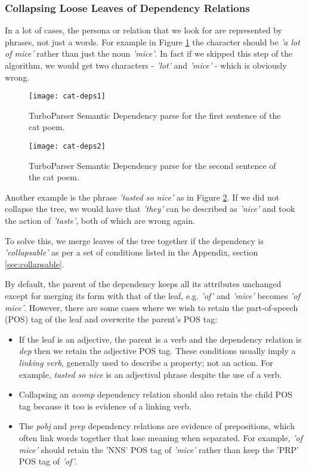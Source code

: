 \subsubsection{Collapsing Loose Leaves of Dependency Relations}
\label{sec:collapse}

In a lot of cases, the persona or relation that we look for are represented by phrases, not just a words. For example in Figure \ref{fig:cat-deps1} the character should be \textit{'a lot of mice'} rather than just the noun \textit{'mice'}. In fact if we skipped this step of the algorithm, we would get two characters - \textit{'lot'} and \textit{'mice'} - which is obviously wrong.

\begin{figure}[h!]
\centering
\texttt{[image: cat-deps1]}
\caption{TurboParser Semantic Dependency parse for the first sentence of the cat poem.}
\label{fig:cat-deps1}
\end{figure}

\begin{figure}[h!]
\centering
\texttt{[image: cat-deps2]}
\caption{TurboParser Semantic Dependency parse for the second sentence of the cat poem.}
\label{fig:cat-deps2}
\end{figure}

Another example is the phrase \textit{'tasted so nice'} as in Figure \ref{fig:cat-deps2}. If we did not collapse the tree, we would have that \textit{'they'} can be described as \textit{'nice'} and took the action of \textit{'taste'}, both of which are wrong again.

To solve this, we merge leaves of the tree together if the dependency is \textit{'collapsable'} as per a set of conditions listed in the Appendix, section \ref{sec:collapsable}.

By default, the parent of the dependency keeps all its attributes unchanged except for merging its form with that of the leaf, e.g. \textit{'of'} and \textit{'mice'} becomes \textit{'of mice'}. However, there are some cases where we wish to retain the part-of-speech (POS) tag of the leaf and overwrite the parent's POS tag:

\begin{itemize}
\item{If the leaf is an adjective, the parent is a verb and the dependency relation is \textit{dep} then we retain the adjective POS tag. These conditions usually imply a \textit{linking verb}, generally used to describe a property; not an action. For example, \textit{tasted so nice} is an adjectival phrase despite the use of a verb.}
\item{Collapsing an \textit{acomp} dependency relation should also retain the child POS tag because it too is evidence of a linking verb.}
\item{The \textit{pobj} and \textit{prep} dependency relations are evidence of prepositions, which often link words together that lose meaning when separated. For example, \textit{'of mice'} should retain the 'NNS' POS tag of \textit{'mice'} rather than keep the 'PRP' POS tag of \textit{'of'}.}
\end{itemize}

